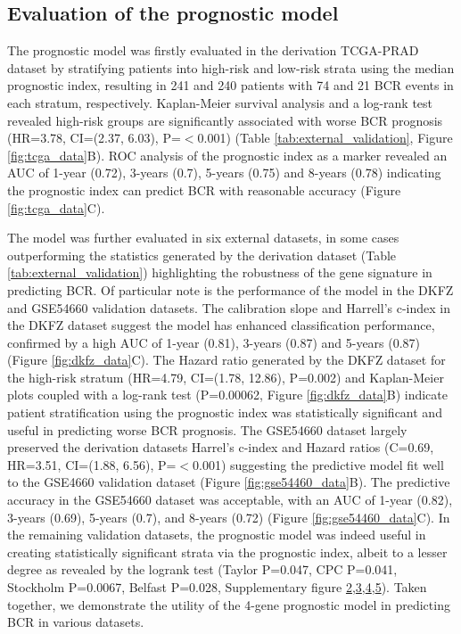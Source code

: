 \documentclass[twocolumn]{bmcart}%
\begin{document}
\subsection*{\textbf{Evaluation of the prognostic model}}
The prognostic model was firstly evaluated in the derivation TCGA-PRAD dataset by stratifying patients into high-risk and low-risk strata using the median prognostic index, resulting in 241 and 240 patients with 74 and 21 BCR events in each stratum, respectively. Kaplan-Meier survival analysis and a log-rank test revealed high-risk groups are significantly associated with worse BCR prognosis (HR=3.78, CI=(2.37, 6.03), P=$<$0.001) (Table \ref{tab:external_validation}, Figure \ref{fig:tcga_data}B). ROC analysis of the prognostic index as a marker revealed an AUC of 1-year (0.72), 3-years (0.7), 5-years (0.75) and 8-years (0.78) indicating the prognostic index can predict BCR with reasonable accuracy (Figure \ref{fig:tcga_data}C). \par
The model was further evaluated in six external datasets, in some cases outperforming the statistics generated by the derivation dataset (Table \ref{tab:external_validation}) highlighting the robustness of the gene signature in predicting BCR. Of particular note is the performance of the model in the DKFZ and GSE54660 validation datasets. The calibration slope and Harrell's c-index in the DKFZ dataset suggest the model has enhanced classification performance, confirmed by a high AUC of 1-year (0.81), 3-years (0.87) and 5-years (0.87) (Figure \ref{fig:dkfz_data}C). The Hazard ratio generated by the DKFZ dataset for the high-risk stratum (HR=4.79, CI=(1.78, 12.86), P=0.002) and Kaplan-Meier plots coupled with a log-rank test (P=0.00062, Figure \ref{fig:dkfz_data}B) indicate patient stratification using the prognostic index was statistically significant and useful in predicting worse BCR prognosis. The GSE54660 dataset largely preserved the derivation datasets Harrel's c-index and Hazard ratios (C=0.69, HR=3.51, CI=(1.88, 6.56), P=$<$0.001) suggesting the predictive model fit well to the GSE4660 validation dataset (Figure \ref{fig:gse54460_data}B). The predictive accuracy in the GSE54660 dataset was acceptable, with an AUC of 1-year (0.82), 3-years (0.69), 5-years (0.7), and 8-years (0.72) (Figure \ref{fig:gse54460_data}C). In the remaining validation datasets, the prognostic model was indeed useful in creating statistically significant strata via the prognostic index, albeit to a lesser degree as revealed by the logrank test (Taylor P=0.047, CPC P=0.041, Stockholm P=0.0067, Belfast P=0.028, Supplementary figure \href{https://github.com/BarryDigby/pca_network/blob/main/results/external/Belfast/Belfast_plot.png}{2},\href{https://github.com/BarryDigby/pca_network/blob/main/results/external/CPC/CPC_plots.png}{3},\href{https://github.com/BarryDigby/pca_network/blob/main/results/external/Stockholm/Stockholm_plots.png}{4},\href{https://github.com/BarryDigby/pca_network/blob/main/results/external/Taylor/Taylor_plots.png}{5}). Taken together, we demonstrate the utility of the 4-gene prognostic model in predicting BCR in various datasets.
\end{document}
